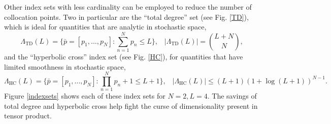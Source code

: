 \documentclass{mc2015}
\begin{document}
Other index sets with less cardinality can be employed to reduce the number of collocation points.  Two in particular are the ``total degree'' set (see Fig. \ref{TD}), which is ideal for quantities that are analytic in stochastic space,
\begin{equation}
\Lambda_\text{TD}(L)=\Big\{\bar p=[p_1,...,p_N]:\sum_{n=1}^N p_n \leq L \Big\},\hspace{10pt}|\Lambda_\text{TD}(L)|={L+N\choose N},
\end{equation}
and the ``hyperbolic cross'' index set (see Fig. \ref{HC}), for quantities that have limited smoothness in stochastic space,
\begin{equation}
\Lambda_\text{HC}(L)=\Big\{\bar p=[p_1,...,p_N]:\prod_{n=1}^N p_n+1 \leq L+1 \Big\},\hspace{10pt}|\Lambda_\text{HC}(L)|\leq (L+1)(1+\log(L+1))^{N-1}.
\end{equation}
Figure \ref{indexsets} shows each of these index sets for $N=2,L=4$.  The savings of total degree and hyperbolic cross help fight the curse of dimensionality present in tensor product. 
\end{document}
